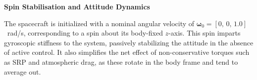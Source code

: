 \documentclass[final,3p,times,twocolumn]{elsarticle}
\begin{document}




\vspace{10pt}
\noindent\textbf{Spin Stabilisation and Attitude Dynamics} \vspace{2pt}

\noindent The spacecraft is initialized with a nominal angular velocity of $\boldsymbol{\omega}_0 = [0,\,0,\,1.0]$~rad/s, corresponding to a spin about its body-fixed $z$-axis. This spin imparts gyroscopic stiffness to the system, passively stabilizing the attitude in the absence of active control. It also simplifies the net effect of non-conservative torques such as SRP and atmospheric drag, as these rotate in the body frame and tend to average out.
\end{document}
